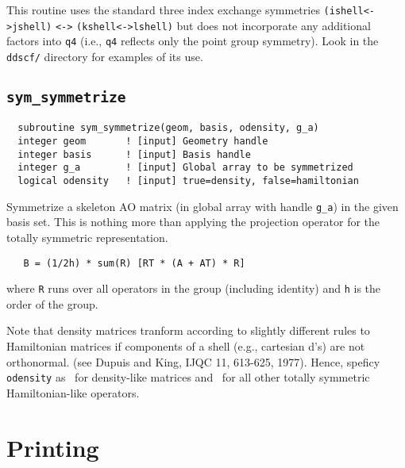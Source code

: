 This routine uses the standard three index exchange symmetries
\verb+(ishell<->jshell)+ \verb+<->+ \verb+(kshell<->lshell)+ but does
not incorporate any additional factors into \verb+q4+ (i.e., \verb+q4+
reflects only the point group symmetry).  Look in the \verb+ddscf/+
directory for examples of its use.

\subsection{{\tt sym\_symmetrize}}
\begin{verbatim}
  subroutine sym_symmetrize(geom, basis, odensity, g_a)
  integer geom       ! [input] Geometry handle
  integer basis      ! [input] Basis handle
  integer g_a        ! [input] Global array to be symmetrized
  logical odensity   ! [input] true=density, false=hamiltonian
\end{verbatim}
Symmetrize a skeleton AO matrix (in global array with handle
\verb+g_a+) in the given basis set.  This is nothing more than
applying the projection operator for the totally symmetric
representation.
\begin{verbatim}
   B = (1/2h) * sum(R) [RT * (A + AT) * R]
\end{verbatim}
where \verb+R+ runs over all operators in the group (including
identity) and \verb+h+ is the order of the group.

Note that density matrices tranform according to slightly different
rules to Hamiltonian matrices if components of a shell (e.g.,
cartesian d's) are not orthonormal.  (see Dupuis and King, IJQC 11,
613-625, 1977).  Hence, speficy \verb+odensity+ as \TRUE\ for
density-like matrices and \FALSE\ for all other totally symmetric
Hamiltonian-like operators.

\section{Printing}

